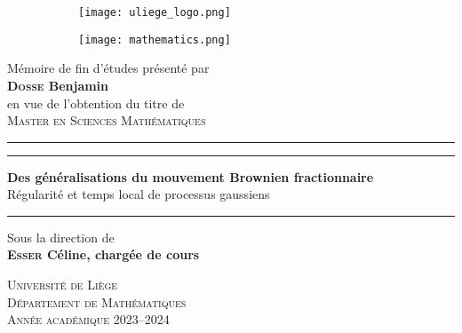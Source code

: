 \BgThispage
\begin{titlepage}
  \pagestyle{empty}

  \begin{figure}[!h]
    \centering
    \begin{subfigure}[b]{0.25\textwidth}
      \texttt{[image: uliege\_logo.png]}
    \end{subfigure}
    \hfill
    \begin{subfigure}[b]{0.4\textwidth}
      \texttt{[image: mathematics.png]}
    \end{subfigure}
  \end{figure}
  
  \vspace{5em}

  \center
  \large
  Mémoire de fin d'études présenté par\\
  \vspace{0.5em}
  \LARGE
  \textbf{\textsc{Dosse} Benjamin}\\
  \vspace{1em}
  \large
  en vue de l'obtention du titre de\\
  \vspace{0.5em}
  \LARGE
  \textsc{Master en Sciences Mathématiques}  

  \vspace{3em}

  \hrule height 2pt
  \vspace{1pt}
  \hrule height 1.1pt
  \vspace{1em}
  \textbf{{\Huge Des généralisations du mouvement Brownien fractionnaire}}\\
  \vspace{2em}
  {\huge Régularité et temps local de processus gaussiens}
  \vspace{1em}
  \hrule height 2pt

  \vspace{3em}

  \large
  Sous la direction de\\
  \vspace{0.5em}
  \LARGE
  \textbf{\textsc{Esser} Céline, chargée de cours}
  
  \vfill
  \normalsize
  \textsc{Université de Liège\\Département de Mathématiques\\Année
    académique 2023--2024}
  

\end{titlepage}
\restoregeometry